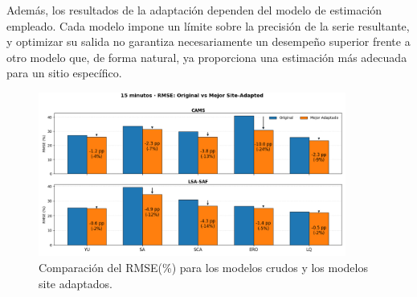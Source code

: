 Además, los resultados de la adaptación dependen del modelo de estimación empleado. Cada modelo impone un límite sobre la precisión de la serie resultante, y optimizar su salida no garantiza necesariamente un desempeño superior frente a otro modelo que, de forma natural, ya proporciona una estimación más adecuada para un sitio específico.\\





\begin{figure}
    \centering
    \includegraphics[width=0.9\textwidth]{figuras/comparativasRMSE15.png}
    \caption{Comparación del RMSE(\%) para los modelos crudos y los modelos site adaptados.}
    \label{fig:RMSE-15}
\end{figure}





